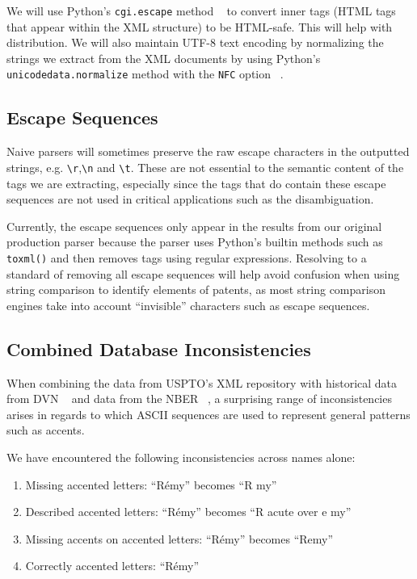 \documentclass[11pt]{article}
\begin{document}
We will use Python's \verb`cgi.escape` method ~\cite{cgiescape} to convert inner
tags (HTML tags that appear within the XML structure) to be HTML-safe. This
will help with distribution. We will also maintain UTF-8 text encoding by
normalizing the strings we extract from the XML documents by using Python's
\verb`unicodedata.normalize` method with the \verb`NFC` option
~\cite{unicodenormalize}.

\subsection{Escape Sequences}

Naive parsers will sometimes preserve the raw escape characters in the
outputted strings, e.g.  \verb`\r`,\verb`\n` and \verb`\t`.  These are not
essential to the semantic content of the tags we are extracting, especially
since the tags that do contain these escape sequences are not used in critical
applications such as the disambiguation.

Currently, the escape sequences only appear in the results from our original
production parser because the parser uses Python's builtin methods such as
\texttt{toxml()} and then removes tags using regular expressions. Resolving to
a standard of removing all escape sequences will help avoid confusion when
using string comparison to identify elements of patents, as most string
comparison engines take into account ``invisible'' characters such as escape
sequences.

\subsection{Combined Database Inconsistencies}

When combining the data from USPTO's XML repository with historical data from
DVN ~\cite{disambiguation} and data from the NBER ~\cite{NBERw8498}, a
surprising range of inconsistencies arises in regards to which ASCII sequences
are used to represent general patterns such as accents.

We have encountered the following inconsistencies across names alone:

\begin{enumerate}
    \item Missing accented letters: ``R\'{e}my'' becomes ``R my''
    \item Described accented letters: ``R\'{e}my'' becomes ``R acute over e my''
    \item Missing accents on accented letters: ``R\'{e}my'' becomes ``Remy''
    \item Correctly accented letters: ``R\'{e}my''
\end{enumerate}
\end{document}
